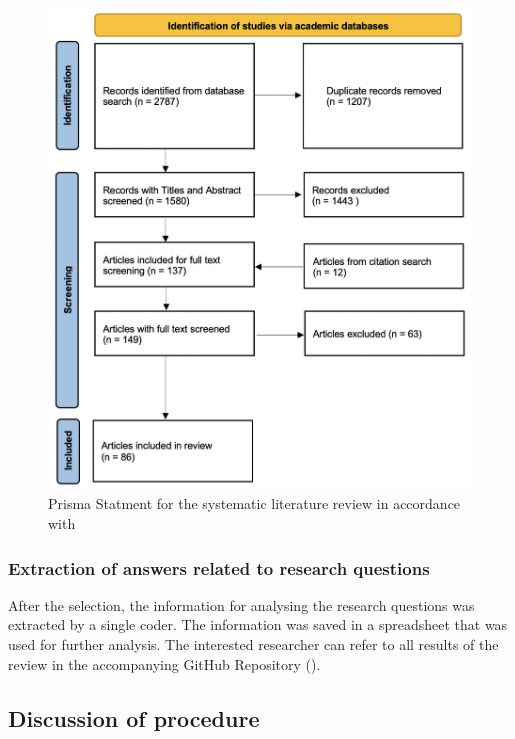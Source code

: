 \begin{figure}
    \centering
    \includegraphics[width=\textwidth]{reports/figures/Prisma Statement.png}
    \caption{Prisma Statment for the systematic literature review in accordance with \cite{page_prisma_2021}}
    \label{fig: Prisma Statement}
\end{figure}

\subsubsection{Extraction of answers related to research questions}

After the selection, the information for analysing the research questions was extracted by a single coder. The information was saved in a spreadsheet that was used for further analysis. The interested researcher can refer to all results of the review in the accompanying GitHub Repository (\cite{langenbahn_smartphone_2021}).


\subsection{Discussion of procedure}

